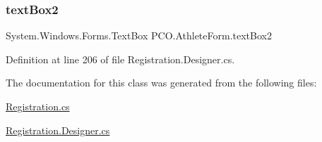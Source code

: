 \subsubsection{\texorpdfstring{text\+Box2}{textBox2}}
{\footnotesize\ttfamily System.\+Windows.\+Forms.\+Text\+Box P\+C\+O.\+Athlete\+Form.\+text\+Box2\hspace{0.3cm}{\ttfamily [private]}}



Definition at line 206 of file Registration.\+Designer.\+cs.



The documentation for this class was generated from the following files\+:\begin{DoxyCompactItemize}
\item 
\hyperlink{Registration_8cs}{Registration.\+cs}\item 
\hyperlink{Registration_8Designer_8cs}{Registration.\+Designer.\+cs}\end{DoxyCompactItemize}
